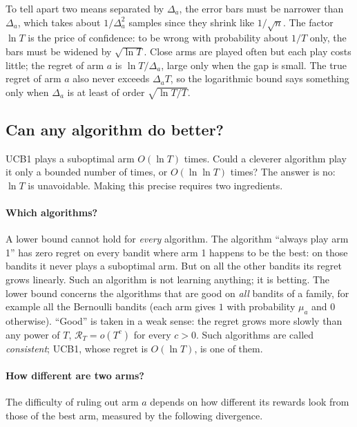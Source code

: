 \begin{intuition}
  To tell apart two means separated by $\Delta_a$, the error bars must be
  narrower than $\Delta_a$, which takes about $1 / \Delta_a^2$ samples
  since they shrink like $1 / \sqrt{n}$. The factor $\ln T$ is the price of
  confidence: to be wrong with probability about $1/T$ only, the bars must
  be widened by $\sqrt{\ln T}$. Close arms are played often but each play
  costs little; the regret of arm $a$ is $\ln T / \Delta_a$, large only when
  the gap is small. The true regret of arm $a$ also never exceeds
  $\Delta_a T$, so the logarithmic bound says something only when $\Delta_a$
  is at least of order $\sqrt{\ln T / T}$.
\end{intuition}

\subsection{Can any algorithm do better?}

UCB1 plays a suboptimal arm $O(\ln T)$ times. Could a cleverer algorithm
play it only a bounded number of times, or $O(\ln \ln T)$ times? The answer
is no: $\ln T$ is unavoidable. Making this precise requires two
ingredients.

\paragraph{Which algorithms?} A lower bound cannot hold for \emph{every}
algorithm. The algorithm ``always play arm 1'' has zero regret on every
bandit where arm 1 happens to be the best: on those bandits it never plays
a suboptimal arm. But on all the other bandits its regret grows linearly.
Such an algorithm is not learning anything; it is betting. The lower bound
concerns the algorithms that are good on \emph{all} bandits of a family,
for example all the Bernoulli bandits (each arm gives $1$ with probability
$\mu_a$ and $0$ otherwise). ``Good'' is taken in a weak sense: the regret
grows more slowly than any power of $T$, $\mathcal{R}_T = o(T^c)$ for
every $c > 0$. Such algorithms are called \emph{consistent}; UCB1, whose
regret is $O(\ln T)$, is one of them.

\paragraph{How different are two arms?} The difficulty of ruling out arm
$a$ depends on how different its rewards look from those of the best arm,
measured by the following divergence.

